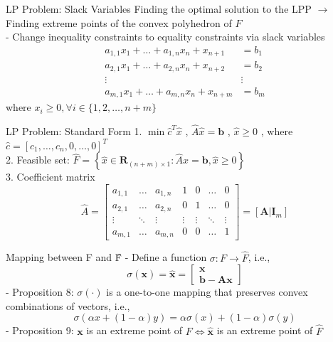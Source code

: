 \documentclass[aspectratio=169,hyperref,UTF8,CJK]{beamer}
\begin{document}
\begin{frame}{LP Problem: Slack Variables}
Finding the optimal solution to the LPP \(\longrightarrow\) Finding extreme points of the convex polyhedron of \(F\) \\
- Change inequality constraints to equality constraints via slack variables
\begin{align*}
a_{1,1}x_{1} + \ldots +a_{1,n}x_{n} + x_{n + 1} &= b_{1} \\
a_{2,1}x_{1} + \ldots +a_{2,n}x_{n} + x_{n + 2} &= b_{2} \\
\vdots & \vdots \\
a_{m,1}x_{1} + \ldots +a_{m,n}x_{n} + x_{n + m} &= b_{m}
\end{align*}
where \(x_{i} \geq 0, \forall i \in \{1, 2, \ldots , n + m\}\)
\end{frame}

\begin{frame}{LP Problem: Standard Form}
1. \(\min \hat{c}^{T}\hat{x}\) , \(\hat{A}\hat{x} = \mathbf{b}\) , \(\hat{x}\geq 0\) , where \(\hat{c} = [c_{1},\ldots ,c_{n},0,\ldots ,0]^{T}\) \\
2. Feasible set: \(\hat{F} = \left\{\hat{x}\in \mathbf{R}_{(n + m)\times 1}:\hat{A}\hat{x} = \mathbf{b},\hat{x}\geq 0\right\}\) \\
3. Coefficient matrix 
\[
\hat{A} = \begin{bmatrix} a_{1,1} & \ldots & a_{1,n} & 1 & 0 & \ldots & 0\\ a_{2,1} & \ldots & a_{2,n} & 0 & 1 & \ldots & 0\\ \vdots & \ddots & \vdots & \vdots & \vdots & \ddots & \vdots \\ a_{m,1} & \ldots & a_{m,n} & 0 & 0 & \ldots & 1 \end{bmatrix} = \left[ \mathbf{A}|\mathbf{I}_{m} \right]
\]
\end{frame}

\begin{frame}{Mapping between F and F̂}
- Define a function \(\sigma : F \to \hat{F}\), i.e.,
\[
\sigma(\mathbf{x}) = \hat{\mathbf{x}} = \begin{bmatrix} \mathbf{x} \\ \mathbf{b} - \mathbf{A}\mathbf{x} \end{bmatrix}
\]
- Proposition 8: \(\sigma(\cdot)\) is a one-to-one mapping that preserves convex combinations of vectors, i.e.,
\[
\sigma(\alpha x + (1 - \alpha)y) = \alpha\sigma(x) + (1 - \alpha)\sigma(y)
\]
- Proposition 9: \(\mathbf{x}\) is an extreme point of \(F \iff \hat{\mathbf{x}}\) is an extreme point of \(\hat{F}\)
\end{frame}
\end{document}
